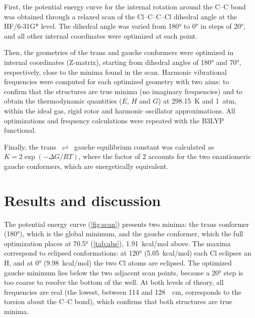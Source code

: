 \documentclass[10pt,a4paper]{article}
\begin{document}
First, the potential energy curve for the internal rotation around the C--C bond
was obtained through a relaxed scan of the Cl--C--C--Cl dihedral angle at the
HF/6-31G* level. The dihedral angle was varied from \ang{180} to \ang{0} in steps
of \ang{20}, and all other internal coordinates were optimized at each point.

Then, the geometries of the trans and gauche conformers were optimized in internal
coordinates (Z-matrix), starting from dihedral angles of \ang{180} and \ang{70},
respectively, close to the minima found in the scan. Harmonic vibrational
frequencies were computed for each optimized geometry with two aims: to confirm
that the structures are true minima (no imaginary frequencies) and to obtain the
thermodynamic quantities ($E$, $H$ and $G$) at \SI{298.15}{\kelvin} and 1~atm,
within the ideal gas, rigid rotor and harmonic oscillator approximations. All
optimizations and frequency calculations were repeated with the B3LYP functional.

Finally, the trans~$\rightleftharpoons$~gauche equilibrium constant was calculated
as $K = 2\exp(-\Delta G/RT)$, where the factor of 2 accounts for the two
enantiomeric gauche conformers, which are energetically equivalent.

\section{Results and discussion} %

The potential energy curve (\cref{fig:scan}) presents two minima: the trans conformer
(\ang{180}), which is the global minimum, and the gauche conformer, which the full
optimization places at \ang{70.5} (\cref{tab:abs}), 1.91~kcal/mol above. The maxima correspond to
eclipsed conformations: at \ang{120} (5.05~kcal/mol) each Cl eclipses an H, and at
\ang{0} (9.98~kcal/mol) the two Cl atoms are eclipsed. The optimized gauche minimum
lies below the two adjacent scan points, because a \ang{20} step is too coarse to
resolve the bottom of the well. At both levels of theory, all frequencies are real
(the lowest, between 114 and \SI[per-mode=power]{128}{\per\centi\metre}, corresponds to the torsion
about the C--C bond), which confirms that both structures are true minima.
\end{document}
